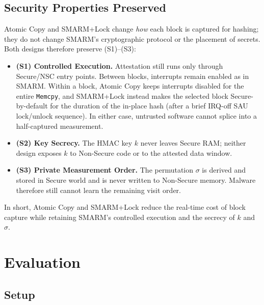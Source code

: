 \documentclass[conference]{IEEEtran}
\newcommand{\smarmlock}{SMARM+Lock\xspace}
\begin{document}
\subsection{Security Properties Preserved}
\label{sec:security_summary}

Atomic Copy and \smarmlock{} change \emph{how} each block is captured
for hashing; they do not change SMARM's cryptographic protocol or the
placement of secrets. Both designs therefore preserve (S1)--(S3):
\begin{itemize}
  \item \textbf{(S1) Controlled Execution.}
    Attestation still runs only through Secure/NSC entry points.
    Between blocks, interrupts remain enabled as in SMARM.
    Within a block, Atomic Copy keeps interrupts disabled for the
    entire \texttt{Memcpy}, and \smarmlock{} instead makes the
    selected block Secure-by-default for the duration of the in-place
    hash (after a brief IRQ-off SAU lock/unlock sequence).
    In either case, untrusted software cannot splice into a
    half-captured measurement.
  \item \textbf{(S2) Key Secrecy.}
    The HMAC key $k$ never leaves Secure RAM; neither design exposes
    $k$ to Non-Secure code or to the attested data window.
  \item \textbf{(S3) Private Measurement Order.}
    The permutation $\sigma$ is derived and stored in Secure world and
    is never written to Non-Secure memory. Malware therefore still
    cannot learn the remaining visit order.
\end{itemize}
In short, Atomic Copy and \smarmlock{} reduce the real-time cost of
block capture while retaining SMARM's controlled execution and the
secrecy of $k$ and $\sigma$.

\section{Evaluation}
\label{sec:eval}

\subsection{Setup}
\end{document}
